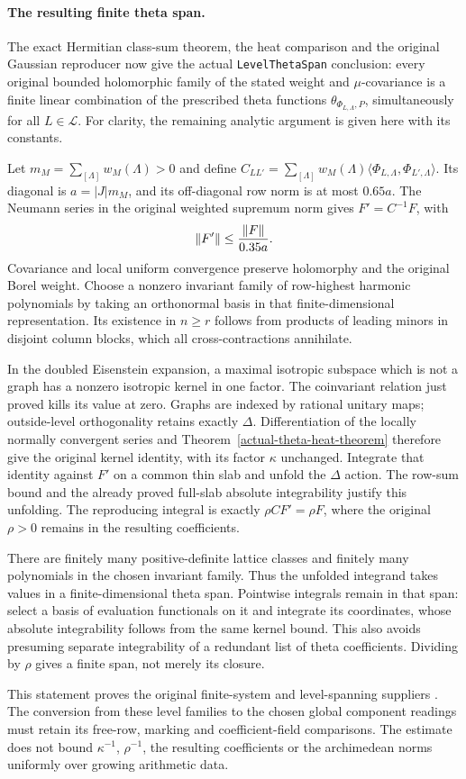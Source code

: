 \paragraph{The resulting finite theta span.}
The exact Hermitian class-sum theorem, the heat comparison and the
original Gaussian reproducer now give the actual
\texttt{LevelThetaSpan} conclusion: every original bounded
holomorphic family of the stated weight and $\mu$-covariance is
a finite linear combination of the prescribed theta functions
$\theta_{\Phi_{L,\Lambda},P}$, simultaneously for all
$L\in\mathcal L$. For clarity, the remaining analytic argument is
given here with its constants.

Let $m_M=\sum_{[\Lambda]}w_M(\Lambda)>0$ and define
$C_{LL'}=\sum_{[\Lambda]}w_M(\Lambda)
\langle\Phi_{L,\Lambda},\Phi_{L',\Lambda}\rangle$.
Its diagonal is $a=|J|m_M$, and its off-diagonal row norm is at
most $0.65a$. The Neumann series in the original weighted
supremum norm gives $F'=C^{-1}F$, with
\[
                  \|F'\|\le{\|F\|\over0.35a}.
\]
Covariance and local uniform convergence preserve holomorphy and
the original Borel weight. Choose a nonzero invariant family of
row-highest harmonic polynomials by taking an orthonormal basis
in that finite-dimensional representation. Its existence in
$n\ge r$ follows from products of leading minors in disjoint
column blocks, which all cross-contractions annihilate.

In the doubled Eisenstein expansion, a maximal isotropic subspace
which is not a graph has a nonzero isotropic kernel in one factor.
The coinvariant relation just proved kills its value at zero.
Graphs are indexed by rational unitary maps; outside-level
orthogonality retains exactly $\Delta$. Differentiation of the
locally normally convergent series and
Theorem~\ref{actual-theta-heat-theorem} therefore give the original
kernel identity, with its factor $\kappa$ unchanged.
Integrate that identity against $F'$ on a common thin slab and
unfold the $\Delta$ action. The row-sum bound and the already
proved full-slab absolute integrability justify this unfolding.
The reproducing integral is exactly $\rho C F'=\rho F$,
where the original $\rho>0$ remains in the resulting coefficients.

There are finitely many positive-definite lattice classes and
finitely many polynomials in the chosen invariant family. Thus
the unfolded integrand takes values in a finite-dimensional theta
span. Pointwise integrals remain in that span: select a basis of
evaluation functionals on it and integrate its coordinates, whose
absolute integrability follows from the same kernel bound.
This also avoids presuming separate integrability of a redundant
list of theta coefficients. Dividing by $\rho$ gives a finite
span, not merely its closure.

This statement proves the original finite-system and level-spanning
suppliers \cite{actual-sw-source}. The conversion from these level
families to the chosen global component readings must retain its
free-row, marking and coefficient-field comparisons. The estimate
does not bound $\kappa^{-1}$, $\rho^{-1}$, the resulting coefficients
or the archimedean norms uniformly over growing arithmetic data.
